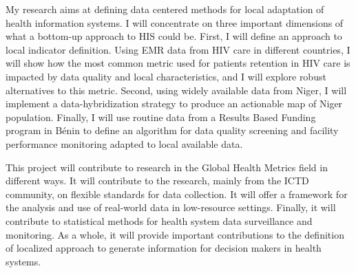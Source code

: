 \documentclass[a4paper,11pt,twoside]{article}
\begin{document}
My research aims at defining data centered methods for local adaptation of health information systems. I will concentrate on three important dimensions of what a bottom-up approach to HIS could be. First, I will define an approach to local indicator definition. Using EMR data from HIV care in different countries, I will show how the most common metric used for patients retention in HIV care is impacted by data quality and local characteristics, and I will explore robust alternatives to this metric. Second, using widely available data from Niger, I will implement a data-hybridization strategy to produce an actionable map of Niger population. Finally, I will use routine data from a Results Based Funding program in Bénin to define an algorithm for data quality screening and facility performance monitoring adapted to local available data.

This project will contribute to research in the Global Health Metrics field in different ways. It will contribute to the research, mainly from the ICTD community, on flexible standards for data collection. It will offer a framework for the analysis and use of real-world data in low-resource settings. Finally, it will contribute to statistical methods for health system data surveillance and monitoring. As a whole, it will provide important contributions to the definition of  localized approach to generate information for decision makers in health systems.

\cleardoublepage
\tableofcontents
{}
\newpage
{}
\listoffigures
\newpage

\thispagestyle{fancy}

\sloppy


\cleardoublepage
{}
\setcounter{page}{1}



\clearpage

\clearpage

\clearpage

\clearpage


\newpage
{}


\end{document}
